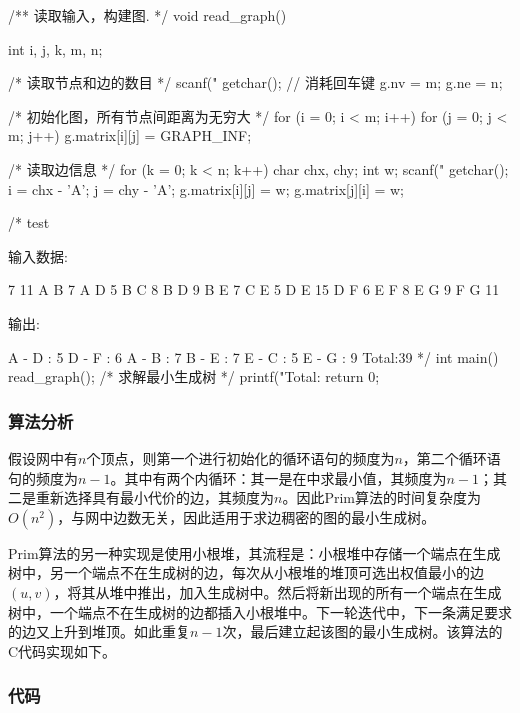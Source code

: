 \begin{Codex}[label=mgraph_prim1.c]
/** 读取输入，构建图. */
void read_graph() {
    int i, j, k, m, n;

    /* 读取节点和边的数目 */
    scanf("%
    getchar(); // 消耗回车键
    g.nv = m;
    g.ne = n;

    /* 初始化图，所有节点间距离为无穷大 */
    for (i = 0; i < m; i++) {
        for (j = 0; j < m; j++) {
            g.matrix[i][j] = GRAPH_INF;
        }
    }

    /* 读取边信息 */
    for (k = 0; k < n; k++) {
        char chx, chy;
        int w;
        scanf("%
        getchar();
        i = chx - 'A';
        j = chy - 'A';
        g.matrix[i][j] = w;
        g.matrix[j][i] = w;
    }
}

/* test

输入数据:

7 11
A B 7
A D 5
B C 8
B D 9
B E 7
C E 5
D E 15
D F 6
E F 8
E G 9
F G 11

输出:

A - D : 5
D - F : 6
A - B : 7
B - E : 7
E - C : 5
E - G : 9
Total:39
*/
int main() {
    read_graph();
    /* 求解最小生成树 */
    printf("Total:%
    return 0;
}
\end{Codex}

\subsubsection{算法分析}
假设网中有$n$个顶点，则第一个进行初始化的循环语句的频度为$n$，第二个循环语句的频度为$n-1$。其中有两个内循环：其一是在中求最小值，其频度为$n-1$；其二是重新选择具有最小代价的边，其频度为$n$。因此Prim算法的时间复杂度为$O(n^2)$，与网中边数无关，因此适用于求边稠密的图的最小生成树。

Prim算法的另一种实现是使用小根堆，其流程是：小根堆中存储一个端点在生成树中，另一个端点不在生成树的边，每次从小根堆的堆顶可选出权值最小的边$(u, v)$，将其从堆中推出，加入生成树中。然后将新出现的所有一个端点在生成树中，一个端点不在生成树的边都插入小根堆中。下一轮迭代中，下一条满足要求的边又上升到堆顶。如此重复$n-1$次，最后建立起该图的最小生成树。该算法的C代码实现如下。

\subsubsection{代码}

